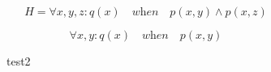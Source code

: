 \documentclass[../Master.tex]{subfiles}
\begin{document}
\begin{example}
    \begin{equation*}
        H = \forall x, y, z : q(x) \quad \textit{when} \quad
            p(x,y) \land p(x,z)
    \end{equation*}

    \begin{equation}
        \forall x, y : q(x) \quad \textit{when} \quad p(x,y)
    \end{equation}

    \begin{figure}
        \centering
        \hfill
        \begin{subfigure}[b]{0.4\textwidth}
            \centering
            \resizebox{0.7\linewidth}{!}{}
            \caption{test2}
            \label{fig:ex:ca:hgma:ex:isomorphic}
        \end{subfigure}%
        \hfill%
        \begin{subfigure}[b]{0.4\textwidth}
            \centering
            \resizebox{0.75\linewidth}{!}{}
            \caption{}
            \label{fig:ex:ca:hgma:ex:isomorphic_reduced}
        \end{subfigure}
        \hfill
    \end{figure}
\end{example}
\end{document}
